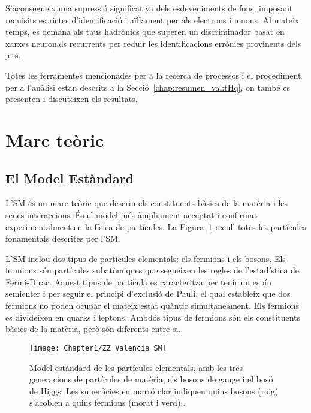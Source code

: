 S'aconsegueix una supressió significativa dels esdeveniments de fons, imposant requisits estrictes d'identificació i aïllament 
per als electrons i muons. Al mateix temps, es demana als taus hadrònics que superen un discriminador basat en xarxes 
neuronals recurrents per reduir les identificacions errònies provinents dels jets.

Totes les ferramentes mencionades per a la recerca de processos \tH i el procediment per a l'anàlisi estan descrits a la 
Secció~\ref{chap:resumen_val:tHq}, on també es presenten i discuteixen els resultats.

\section{Marc teòric}
\label{chap:resumen_val:Teoria}

\subsection{El Model Estàndard}
L'SM és un marc teòric que descriu els constituents 
bàsics de la matèria i les seues interaccions. És el model més àmpliament acceptat i confirmat experimentalment 
en la física de partícules. La Figura~\ref{fig:resumen_val:Teoria:SM} recull totes les partícules fonamentals descrites per l'SM.

L'SM inclou dos tipus de partícules elementals: els fermions i els bosons.
Els fermions són partícules subatòmiques que segueixen les regles de l'estadística de Fermi-Dirac. 
Aquest tipus de partícula es caracteritza per tenir un espín semienter i per seguir el principi d'exclusió 
de Pauli, el qual estableix que dos fermions no poden ocupar el mateix estat quàntic simultaneament. 
Els fermions es divideixen en quarks i leptons. Ambdós tipus de fermions són els constituents bàsics 
de la matèria, però són diferents entre si.

\begin{figure}[h]
 	 \centering
 	  \texttt{[image: Chapter1/ZZ\_Valencia\_SM]}
	  \caption{Model estàndard de les partícules elementals, amb les tres generacions de partícules de 
	  matèria, els bosons de gauge i el bosó de Higgs. Les superfícies en marró clar indiquen quins 
	  bosons (roig) s'acoblen a quins fermions (morat i verd)..} 
	\label{fig:resumen_val:Teoria:SM}
\end{figure}


